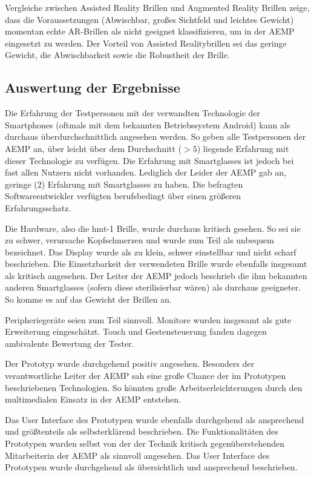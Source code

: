 Vergleiche zwischen Assisted Reality Brillen und Augmented Reality Brillen zeige, dass die Voraussetzungen (Abwischbar, großes Sichtfeld und leichtes Gewicht) momentan echte AR-Brillen als nicht geeignet klassifizieren, um in der AEMP eingesetzt zu werden. Der Vorteil von Assisted Realitybrillen sei das geringe Gewicht, die Abwischbarkeit sowie die Robustheit der Brille.
%
%
%
\subsection{Auswertung der Ergebnisse}
\label{sec:Auswertung_der_Ergebnisse}
%
%
%
Die Erfahrung der Testpersonen mit der verwandten Technologie der Smartphones (oftmals mit dem bekannten Betriebssystem Android) kann als durchaus überdurchschnittlich angesehen werden. So geben alle Testpersonen der AEMP an, über leicht über dem Durchschnitt ($>5$) liegende Erfahrung mit dieser Technologie zu verfügen. Die Erfahrung mit Smartglasses ist jedoch bei fast allen Nutzern nicht vorhanden. Lediglich der Leider der AEMP gab an, geringe (2) Erfahrung mit Smartglasses zu haben. Die befragten Softwareentwickler verfügten berufsbedingt über einen größeren Erfahrungsschatz.

Die Hardware, also die hmt-1 Brille, wurde durchaus kritisch gesehen. So sei sie zu schwer, verursache Kopfschmerzen und wurde zum Teil als unbequem bezeichnet. Das Display wurde als zu klein, schwer einstellbar und nicht scharf beschrieben. Die Einsetzbarkeit der verwendeten Brille wurde ebenfalls insgesamt als kritisch angesehen. Der Leiter der AEMP jedoch beschrieb die ihm bekannten anderen Smartglasses (sofern diese sterilisierbar wären) als durchaus geeigneter. So komme es auf das Gewicht der Brillen an. 

Peripheriegeräte seien zum Teil sinnvoll. Monitore wurden insgesamt als gute Erweiterung eingeschätzt. Touch und Gestensteuerung fanden dagegen ambivalente Bewertung der Tester.

Der Prototyp wurde durchgehend positiv angesehen. Besonders der verantwortliche Leiter der AEMP sah eine große Chance der im Prototypen beschriebenen Technologien. So könnten große Arbeitserleichterungen durch den multimedialen Einsatz in der AEMP entstehen. 

Das User Interface des Prototypen wurde ebenfalls durchgehend als ansprechend und größtenteils als selbsterklärend beschrieben. Die Funktionalitäten des Prototypen wurden selbst von der der Technik kritisch gegenüberstehenden Mitarbeiterin der AEMP als sinnvoll angesehen. Das User Interface des Prototypen wurde durchgehend als übersichtlich und ansprechend beschrieben.

